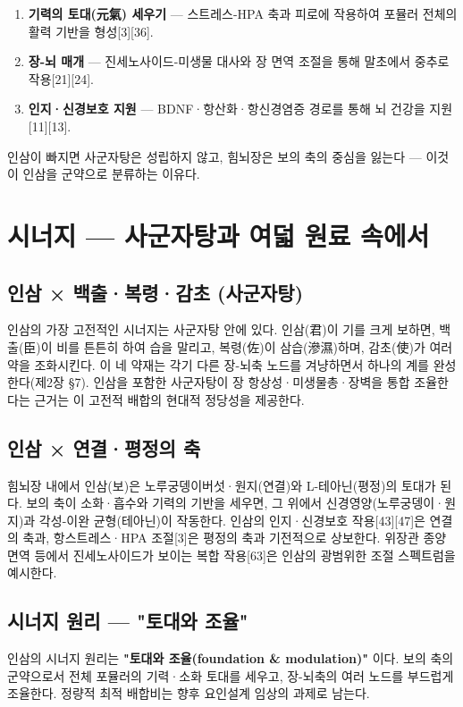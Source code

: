 \documentclass[11pt,oneside]{book}
\begin{document}
\begin{enumerate}[leftmargin=6mm,itemsep=1pt,topsep=2pt]
  \item \textbf{기력의 토대(元氣) 세우기} — 스트레스-HPA 축과 피로에 작용하여 포뮬러 전체의 활력 기반을 형성[3][36].
  \item \textbf{장-뇌 매개} — 진세노사이드-미생물 대사와 장 면역 조절을 통해 말초에서 중추로 작용[21][24].
  \item \textbf{인지·신경보호 지원} — BDNF·항산화·항신경염증 경로를 통해 뇌 건강을 지원[11][13].
\end{enumerate}
인삼이 빠지면 사군자탕은 성립하지 않고, 힘뇌장은 보의 축의 중심을 잃는다 — 이것이 인삼을 군약으로 분류하는 이유다.

\section{시너지 — 사군자탕과 여덟 원료 속에서}
\subsection{인삼 × 백출·복령·감초 (사군자탕)}
인삼의 가장 고전적인 시너지는 사군자탕 안에 있다. 인삼(君)이 기를 크게 보하면, 백출(臣)이 비를 튼튼히 하여 습을 말리고, 복령(佐)이 삼습(滲濕)하며, 감초(使)가 여러 약을 조화시킨다. 이 네 약재는 각기 다른 장-뇌축 노드를 겨냥하면서 하나의 계를 완성한다(제2장 §7). 인삼을 포함한 사군자탕이 장 항상성·미생물총·장벽을 통합 조율한다는 근거는 이 고전적 배합의 현대적 정당성을 제공한다.

\subsection{인삼 × 연결·평정의 축}
힘뇌장 내에서 인삼(보)은 노루궁뎅이버섯·원지(연결)와 L-테아닌(평정)의 토대가 된다. 보의 축이 소화·흡수와 기력의 기반을 세우면, 그 위에서 신경영양(노루궁뎅이·원지)과 각성-이완 균형(테아닌)이 작동한다. 인삼의 인지·신경보호 작용[43][47]은 연결의 축과, 항스트레스·HPA 조절[3]은 평정의 축과 기전적으로 상보한다. 위장관 종양면역 등에서 진세노사이드가 보이는 복합 작용[63]은 인삼의 광범위한 조절 스펙트럼을 예시한다.

\subsection{시너지 원리 — "토대와 조율"}
인삼의 시너지 원리는 \textbf{"토대와 조율(foundation \& modulation)"} 이다. 보의 축의 군약으로서 전체 포뮬러의 기력·소화 토대를 세우고, 장-뇌축의 여러 노드를 부드럽게 조율한다. 정량적 최적 배합비는 향후 요인설계 임상의 과제로 남는다.
\end{document}

